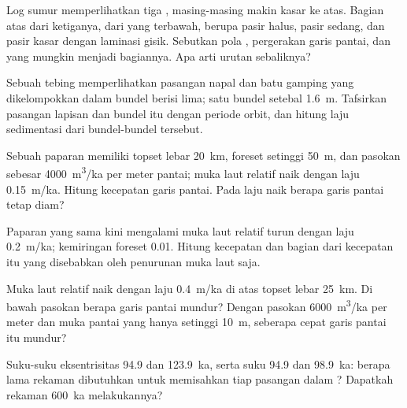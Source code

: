\begin{exercise}[$\star$]\label{exo:b3:sequence-stratigraphy:3}
Log sumur memperlihatkan tiga , masing-masing makin kasar ke atas. Bagian atas dari
ketiganya, dari yang terbawah, berupa pasir halus, pasir sedang, dan pasir kasar dengan
laminasi gisik. Sebutkan pola , pergerakan garis pantai, dan
 yang mungkin menjadi bagiannya. Apa arti urutan sebaliknya?
\end{exercise}

\begin{exercise}[$\star$]\label{exo:b3:sequence-stratigraphy:4}
Sebuah tebing memperlihatkan pasangan napal dan batu gamping yang dikelompokkan dalam bundel berisi lima; satu
bundel setebal \qty{1.6}{m}. Tafsirkan pasangan lapisan dan bundel itu dengan
periode orbit, dan hitung laju sedimentasi dari bundel-bundel tersebut.
\end{exercise}

\begin{exercise}[$\star\star$]\label{exo:b3:sequence-stratigraphy:5}
Sebuah paparan memiliki topset lebar \qty{20}{km}, foreset setinggi \qty{50}{m}, dan
pasokan sebesar \qty{4000}{m^3/ka} per meter pantai; muka laut relatif naik
dengan laju \qty{0.15}{m/ka}. Hitung kecepatan garis pantai. Pada laju naik berapa
garis pantai tetap diam?
\end{exercise}

\begin{exercise}[$\star\star$]\label{exo:b3:sequence-stratigraphy:6}
Paparan yang sama kini mengalami muka laut relatif turun dengan laju \qty{0.2}{m/ka};
kemiringan foreset 0.01. Hitung kecepatan  dan bagian dari kecepatan itu
yang disebabkan oleh penurunan muka laut saja.
\end{exercise}

\begin{exercise}[$\star\star$]\label{exo:b3:sequence-stratigraphy:7}
Muka laut relatif naik dengan laju \qty{0.4}{m/ka} di atas topset lebar \qty{25}{km}.
Di bawah pasokan berapa garis pantai mundur? Dengan pasokan
\qty{6000}{m^3/ka} per meter dan muka pantai yang hanya setinggi \qty{10}{m}, seberapa
cepat garis pantai itu mundur?
\end{exercise}

\begin{exercise}[$\star\star$]\label{exo:b3:sequence-stratigraphy:8}
Suku-suku eksentrisitas 94.9 dan \qty{123.9}{ka}, serta suku 94.9 dan
\qty{98.9}{ka}: berapa lama rekaman dibutuhkan untuk memisahkan tiap pasangan dalam
? Dapatkah rekaman \qty{600}{ka} melakukannya?
\end{exercise}

